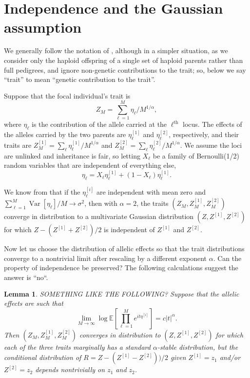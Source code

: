 \documentclass{article}
\newcommand{\E}{\mathbb{E}}
\newcommand{\var}{\mathop{\mbox{Var}}}
\newcommand{\comment}[1]{{\color{blue} \it #1}}
\newtheorem{lem}{Lemma}
\theoremstyle{remark}
\theoremstyle{definition}
\begin{document}
\section{Independence and the Gaussian assumption}

We generally follow the notation of \citet{barton2017infinitesimal},
although in a simpler situation,
as we consider only the haploid offspring of a single set of haploid parents
rather than full pedigrees,
and ignore non-genetic contributions to the trait;
so, below we say ``trait'' to mean ``genetic contribution to the trait''.

Suppose that the focal individual's trait is
$$
    Z_M = \sum_{\ell=1}^M \eta_\ell / M^{1/\alpha},
$$
where $\eta_\ell$ is the contribution of the allele carried at the $\ell^\text{th}$ locus.
The effects of the alleles carried by the two parents
are $\eta_\ell^{[1]}$ and $\eta_\ell^{[2]}$, respectively,
and their traits are
$Z_M^{[1]} = \sum_\ell \eta_\ell^{[1]} / M^{1/\alpha}$ and
$Z_M^{[2]} = \sum_\ell \eta_\ell^{[2]} / M^{1/\alpha}$.
We assume the loci are unlinked and inheritance is fair, so
letting $X_\ell$ be a family of Bernoulli(1/2) random variables that are independent of everything else,
$$
    \eta_\ell = X_\ell \eta_\ell^{[1]} + (1 - X_\ell) \eta_\ell^{[1]} .
$$

We know from \citet{barton2017infinitesimal} that if the $\eta^{[i]}_\ell$ are
independent with mean zero and $\sum_{\ell=1}^M \var[\eta_\ell]/M \to \sigma^2$,
then with $\alpha=2$,
the traits $(Z_M, Z_M^{[1]}, Z_M^{[2]})$ converge in distribution to a multivariate Gaussian distribution
$(Z, Z^{[1]}, Z^{[2]})$ for which $Z - (Z^{[1]} + Z^{[2]})/2$ is independent of $Z^{[1]}$ and $Z^{[2]}$.

Now let us choose the distribution of allelic effects so that
the trait distributions converge to a nontrivial limit after rescaling by a different exponent $\alpha$.
Can the property of independence be preserved?
The following calculations suggest the answer is ``no``.

\begin{lem} \label{lem:nongaussian_nonindep}
    \comment{SOMETHING LIKE THE FOLLOWING?}
    Suppose that the allelic effects are such that
    $$
        \lim_{M \to \infty} \log \E[ \prod_{\ell=1}^M e^{it\eta^{[i]}} ]
        = c |t|^\alpha .
    $$
    Then $(Z_M, Z_M^{[1]}, Z_M^{[2]})$ converges in distribution
    to $(Z, Z^{[1]}, Z^{[2]})$ for which each of the three traits
    marginally has a standard $\alpha$-stable distribution,
    but the conditional distribution of $R = Z - (Z^{[1]} - Z^{[2]}))/2$
    given $Z^{[1]}=z_1$ and/or $Z^{[2]}=z_2$ depends nontrivially on $z_1$ and $z_2$.
\end{lem}
\end{document}
